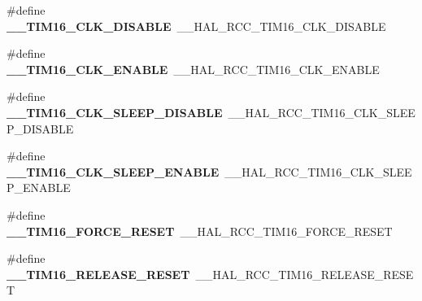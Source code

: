 \begin{DoxyCompactItemize}
\item 
\#define {\bfseries \+\_\+\+\_\+\+T\+I\+M16\+\_\+\+C\+L\+K\+\_\+\+D\+I\+S\+A\+B\+LE}~\+\_\+\+\_\+\+H\+A\+L\+\_\+\+R\+C\+C\+\_\+\+T\+I\+M16\+\_\+\+C\+L\+K\+\_\+\+D\+I\+S\+A\+B\+LE\hypertarget{group___h_a_l___r_c_c___aliased_ga20a13035ec7902e5ca5fdf878cb51ec3}{}\label{group___h_a_l___r_c_c___aliased_ga20a13035ec7902e5ca5fdf878cb51ec3}

\item 
\#define {\bfseries \+\_\+\+\_\+\+T\+I\+M16\+\_\+\+C\+L\+K\+\_\+\+E\+N\+A\+B\+LE}~\+\_\+\+\_\+\+H\+A\+L\+\_\+\+R\+C\+C\+\_\+\+T\+I\+M16\+\_\+\+C\+L\+K\+\_\+\+E\+N\+A\+B\+LE\hypertarget{group___h_a_l___r_c_c___aliased_ga9dc682b745cf3b2bb955bcc5feb4bcd3}{}\label{group___h_a_l___r_c_c___aliased_ga9dc682b745cf3b2bb955bcc5feb4bcd3}

\item 
\#define {\bfseries \+\_\+\+\_\+\+T\+I\+M16\+\_\+\+C\+L\+K\+\_\+\+S\+L\+E\+E\+P\+\_\+\+D\+I\+S\+A\+B\+LE}~\+\_\+\+\_\+\+H\+A\+L\+\_\+\+R\+C\+C\+\_\+\+T\+I\+M16\+\_\+\+C\+L\+K\+\_\+\+S\+L\+E\+E\+P\+\_\+\+D\+I\+S\+A\+B\+LE\hypertarget{group___h_a_l___r_c_c___aliased_ga95b0b3e155fea0b19e66b5d38f4a3810}{}\label{group___h_a_l___r_c_c___aliased_ga95b0b3e155fea0b19e66b5d38f4a3810}

\item 
\#define {\bfseries \+\_\+\+\_\+\+T\+I\+M16\+\_\+\+C\+L\+K\+\_\+\+S\+L\+E\+E\+P\+\_\+\+E\+N\+A\+B\+LE}~\+\_\+\+\_\+\+H\+A\+L\+\_\+\+R\+C\+C\+\_\+\+T\+I\+M16\+\_\+\+C\+L\+K\+\_\+\+S\+L\+E\+E\+P\+\_\+\+E\+N\+A\+B\+LE\hypertarget{group___h_a_l___r_c_c___aliased_gade54c71fcbd16e23c401a6f219df9eaf}{}\label{group___h_a_l___r_c_c___aliased_gade54c71fcbd16e23c401a6f219df9eaf}

\item 
\#define {\bfseries \+\_\+\+\_\+\+T\+I\+M16\+\_\+\+F\+O\+R\+C\+E\+\_\+\+R\+E\+S\+ET}~\+\_\+\+\_\+\+H\+A\+L\+\_\+\+R\+C\+C\+\_\+\+T\+I\+M16\+\_\+\+F\+O\+R\+C\+E\+\_\+\+R\+E\+S\+ET\hypertarget{group___h_a_l___r_c_c___aliased_ga0e1e4dcad1f5857030a9a6aec4ba4750}{}\label{group___h_a_l___r_c_c___aliased_ga0e1e4dcad1f5857030a9a6aec4ba4750}

\item 
\#define {\bfseries \+\_\+\+\_\+\+T\+I\+M16\+\_\+\+R\+E\+L\+E\+A\+S\+E\+\_\+\+R\+E\+S\+ET}~\+\_\+\+\_\+\+H\+A\+L\+\_\+\+R\+C\+C\+\_\+\+T\+I\+M16\+\_\+\+R\+E\+L\+E\+A\+S\+E\+\_\+\+R\+E\+S\+ET\hypertarget{group___h_a_l___r_c_c___aliased_gabc91257ee41523107cae6d7f3413750b}{}\label{group___h_a_l___r_c_c___aliased_gabc91257ee41523107cae6d7f3413750b}


\end{DoxyCompactItemize}
